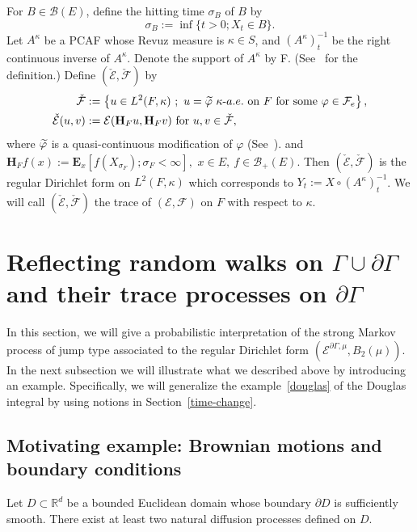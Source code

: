 \documentclass[AHL,Unicode,longabstracts,published]{cedram}
\newcommand{\ce}{\mathcal{E}}
\newcommand{\cf}{\mathcal{F}}
\newcommand{\cb}{\mathcal{B}}
\newcommand{\br}{\mathbb{R}}
\newcommand{\bfE}{\mathbf{E}}
\newcommand{\bfH}{\mathbf{H}}
\let\oldtilde\tilde
\renewcommand*{\tilde}[1]{\mathchoice{\widetilde{#1}}{\widetilde{#1}}{\oldtilde{#1}}{\oldtilde{#1}}}
\begin{document}
\begin{theo}\label{tc}
For $B\in\cb(E)$, define the hitting time $\sigma_B$ of $B$ by
\[
\sigma_B:=\inf\{t>0; X_t\in B\}.
\]
Let $A^{\kappa}$ be a PCAF whose Revuz measure is $\kappa\in S$, and $(A^{\kappa})^{-1}_t$ be the right continuous inverse of $A^{\kappa}$. Denote the support of $A^{\kappa}$ by F. (See~\cite[p.~234]{FOT} for the definition.) Define $(\check{\ce},\check{\cf})$ by
\begin{align*}
\check{\cf}&:=\left\{u\in L^2(F,\kappa)\ ;\ u=\tilde{\varphi}\ \kappa\mathchar`-a.e.\ \text{on}\ F\ \text{for\ some}\ \varphi\in\cf_e\right\},\\
\check{\ce}(u,v)&:=\ce(\bfH_Fu,\bfH_Fv)\ \text{for}\ u,v\in\check{\cf},
\end{align*}
where $\tilde{\varphi}$ is a quasi-continuous modification of $\varphi$ (See~\cite[Theorem~2.1.3]{FOT}). and $\bfH_Ff(x):=\bfE_x\left[f(X_{\sigma_F}); \sigma_F<\infty\right],$ $x\in E,\ f\in\cb_+(E)$. Then $(\check{\ce},\check{\cf})$ is the regular Dirichlet form on $L^2(F,\kappa)$ which corresponds to $Y_t:=X\circ (A^{\kappa})^{-1}_t$. We will call $(\check{\ce},\check{\cf})$ the trace of $(\ce,\cf)$ on $F$ with respect to $\kappa$.
\end{theo}



\section{Reflecting random walks on \texorpdfstring{$\Gamma\cup\partial\Gamma$}{GammaU partial Gamma} and their trace processes on \texorpdfstring{$\partial\Gamma$}{partial Gamma}}\label{reflecting-rw}


In this section, we will give a probabilistic interpretation of the strong Markov process of jump type associated to the regular Dirichlet form $(\ce^{\partial\Gamma,\mu},B_2(\mu))$. In the next subsection we will illustrate what we described above by introducing an example. Specifically, we will generalize the example~\eqref{douglas} of the Douglas integral by using notions in Section~\ref{time-change}.

\subsection{Motivating example: Brownian motions and boundary conditions}

Let $D\subset\br^d$ be a bounded Euclidean domain whose boundary $\partial D$ is sufficiently smooth. There exist at least two natural diffusion processes defined on $D$.
\end{document}

